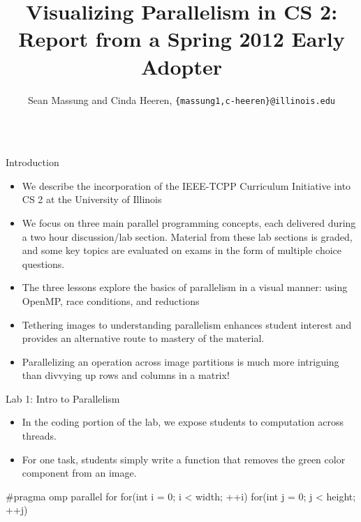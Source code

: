 \documentclass[final,t]{beamer}
\title{\huge Visualizing Parallelism in CS 2: Report from a Spring 2012 Early
Adopter}
\author[Sean Massung and Cinda Heeren]{Sean Massung and Cinda Heeren,
\texttt{\{massung1,c-heeren\}@illinois.edu}}
\institute[University of Illinois]{University of Illinois at Urbana-Champaign,
College of Engineering, Department of Computer Science}
\date{}
\begin{document}
\begin{frame}[fragile]{}
    \begin{columns}[t]
        \begin{column}{.3\linewidth}
            \begin{block}{Introduction}
                \begin{itemize}
                    \item We describe the incorporation of the IEEE-TCPP
                        Curriculum Initiative into CS 2 at the University of
                        Illinois
                    \item We focus on three main parallel programming concepts,
                        each delivered during a two hour discussion/lab section.
                        Material from these lab sections is graded, and some key
                        topics are evaluated on exams in the form of multiple
                        choice questions.
                    \item The three lessons explore the basics of parallelism in a
                        \alert{visual} manner: using OpenMP, race conditions,
                        and reductions
                    \item Tethering images to understanding parallelism enhances
                        student interest and provides an alternative route to
                        mastery of the material.
                    \item Parallelizing an operation across image partitions is
                        much more intriguing than divvying up rows and columns
                        in a matrix!
                \end{itemize}
            \end{block}
            \begin{block}{Lab 1: Intro to Parallelism}
                \begin{itemize}
                    \item In the coding portion of the lab, we expose students
                        to computation across threads.
                    \item For one task, students simply write a function that
                        removes the green color component from an image.
                \end{itemize}
                \begin{cppcode}
#pragma omp parallel for
for(int i = 0; i < width; ++i) {
   for(int j = 0; j < height; ++j) {
}}
\end{cppcode}
\end{block}
\end{column}
\end{columns}
\end{frame}
\end{document}
